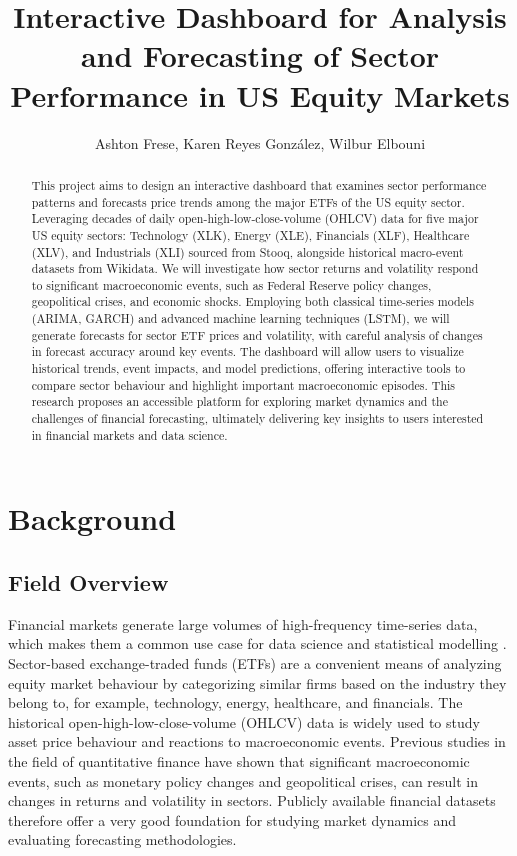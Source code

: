 \documentclass{article}
\title{\textbf{Interactive Dashboard for Analysis and Forecasting of Sector Performance in US Equity Markets}}
\author{Ashton Frese, Karen Reyes González, Wilbur Elbouni}
\begin{document}
\maketitle


% 
\begin{abstract}
\noindent This project aims to design an interactive dashboard that examines sector performance patterns and forecasts price trends among the major ETFs of the US equity sector. Leveraging decades of daily open-high-low-close-volume (OHLCV) data for five major US equity sectors: Technology (XLK), Energy (XLE), Financials (XLF), Healthcare (XLV), and Industrials (XLI) sourced from Stooq, alongside historical macro-event datasets from Wikidata. We will investigate how sector returns and volatility respond to significant macroeconomic events, such as Federal Reserve policy changes, geopolitical crises, and economic shocks. Employing both classical time-series models (ARIMA, GARCH) and advanced machine learning techniques (LSTM), we will generate forecasts for sector ETF prices and volatility, with careful analysis of changes in forecast accuracy around key events. The dashboard will allow users to visualize historical trends, event impacts, and model predictions, offering interactive tools to compare sector behaviour and highlight important macroeconomic episodes. This research proposes an accessible platform for exploring market dynamics and the challenges of financial forecasting, ultimately delivering key insights to users interested in financial markets and data science.
\end{abstract}

\section{Background}

\subsection{Field Overview}
Financial markets generate large volumes of high-frequency time-series data, which makes them a common use case for data science and statistical modelling \cite{cfadata2024}. Sector-based exchange-traded funds (ETFs) are a convenient means of analyzing equity market behaviour by categorizing similar firms based on the industry they belong to, for example, technology, energy, healthcare, and financials. The historical open-high-low-close-volume (OHLCV) data is widely used to study asset price behaviour and reactions to macroeconomic events. Previous studies in the field of quantitative finance have shown that significant macroeconomic events, such as monetary policy changes and geopolitical crises, can result in changes in returns and volatility in sectors. Publicly available financial datasets therefore offer a very good foundation for studying market dynamics and evaluating forecasting methodologies.
\end{document}
